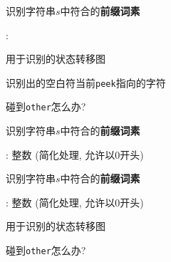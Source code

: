 \begin{frame}{}
  \begin{center}
    识别字符串$s$中符合的{\bf 前缀词素}

    \vspace{0.60cm}
    \ws: \blank \quad \tab \quad \line

    \vspace{0.60cm}

    用于识别的状态转移图

    \pause
    \vspace{0.60cm}
    \red{$\ast$:} 识别出的空白符当前\texttt{peek}指向的字符
    
    \pause
    \vspace{0.40cm}
     碰到\texttt{other}怎么办?
  \end{center}
\end{frame}

\begin{frame}{}
  \begin{center}
    识别字符串$s$中符合的{\bf 前缀词素}

    \vspace{0.60cm}
    \intnum: 整数 (简化处理, 允许以0开头)

    \pause
    \vspace{0.60cm}
  \end{center}
\end{frame}

\begin{frame}{}
  \begin{center}
    识别字符串$s$中符合的{\bf 前缀词素}

    \vspace{0.60cm}
    \intnum: 整数 (简化处理, 允许以0开头)

    \vspace{0.60cm}
    
    用于识别\blue{\intnum}的状态转移图

    \pause
    \vspace{0.40cm}
     碰到\texttt{other}怎么办?
  \end{center}
\end{frame}

